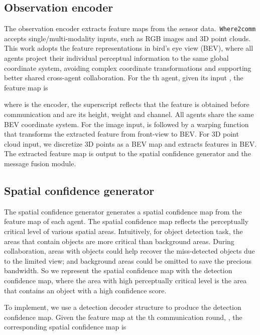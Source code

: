 \documentclass{article}
\begin{document}
\subsection{Observation encoder}
\label{sec:Encoder}
\vspace{-2mm}
The observation encoder extracts feature maps from the sensor data.~\texttt{Where2comm} accepts single/multi-modality inputs, such as RGB images and 3D point clouds. This work adopts the feature representations in bird's eye view (BEV), where all agents project their individual perceptual information to the same global coordinate system, avoiding complex coordinate transformations and supporting better shared cross-agent collaboration. For the th agent, given its input , the feature map is 

where  is the encoder, the superscript  reflects that the feature is obtained before communication and  are its height, weight and channel. All agents share the same BEV coordinate system. For the image input,  is followed by a warping function that transforms the extracted feature from front-view to BEV. For 3D point cloud input, we discretize 3D points as a BEV map and  extracts features in BEV. The extracted feature map is output to the spatial confidence generator and the message fusion module.


\vspace{-2mm}
\subsection{Spatial confidence generator}
\label{sec:Generator}
\vspace{-2mm}
The spatial confidence generator generates a spatial confidence map from the feature map of each agent. The spatial confidence map reflects the perceptually critical level of various spatial areas. Intuitively, for object detection task, the areas that contain objects are more critical than background areas. During collaboration, areas with objects could help recover the miss-detected objects due to the limited view; and background areas could be omitted to save the precious bandwidth. So we represent the spatial confidence map with the detection confidence map, where the area with high perceptually critical level is the area that contains an object with a high confidence score.

To implement, we use a detection decoder structure to produce the detection confidence map. Given the feature map at the th communication round, , the corresponding spatial confidence map is 
\vspace{-1mm}
\end{document}
